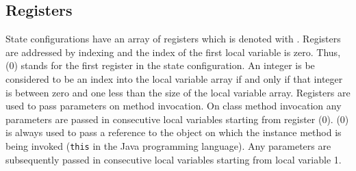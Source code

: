 \subsection{Registers}\label{register}
State configurations have an array of registers which is
 denoted with    
\locVarOnly. Registers are addressed by indexing and 
 the index of the first local variable is zero. 
Thus, \locVarOnly(0) stands for the first register in the state configuration.
 An integer is be considered to be an index into the local variable array if and only if that integer is between zero and one less than the size of the local variable array.
Registers are used to pass parameters on method invocation. On class method
 invocation any parameters are passed in consecutive local variables starting from register \locVarOnly(0). \locVarOnly(0) is always used to pass a
 reference to the object on which the instance method is being invoked
 (\texttt{this} in the Java programming language). Any parameters are subsequently passed in consecutive local variables starting from local variable 1.
